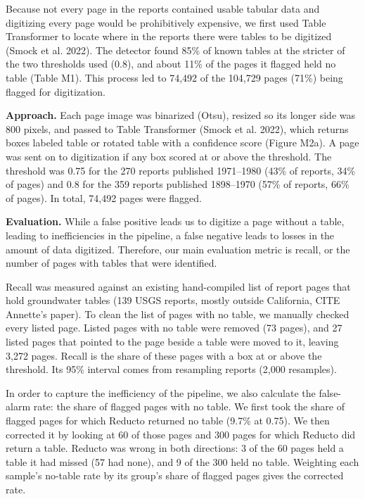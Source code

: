 Because not every page in the reports contained usable tabular data and digitizing every page would be prohibitively expensive, we first used Table Transformer to locate where in the reports there were tables to be digitized (Smock et al. 2022). The detector found 85\% of known tables at the stricter of the two thresholds used (0.8), and about 11\% of the pages it flagged held no table (Table M1). This process led to 74,492 of the 104,729 pages (71\%) being flagged for digitization.

\textbf{Approach.} Each page image was binarized (Otsu), resized so its longer side was 800 pixels, and passed to Table Transformer (Smock et al. 2022), which returns boxes labeled table or rotated table with a confidence score (Figure M2a). A page was sent on to digitization if any box scored at or above the threshold. The threshold was 0.75 for the 270 reports published 1971--1980 (43\% of reports, 34\% of pages) and 0.8 for the 359 reports published 1898--1970 (57\% of reports, 66\% of pages). In total, 74,492 pages were flagged.

\textbf{Evaluation.} While a false positive leads us to digitize a page without a table, leading to inefficiencies in the pipeline, a false negative leads to losses in the amount of data digitized. Therefore, our main evaluation metric is recall, or the number of pages with tables that were identified.

Recall was measured against an existing hand-compiled list of report pages that hold groundwater tables (139 USGS reports, mostly outside California, CITE Annette's paper). To clean the list of pages with no table, we manually checked every listed page. Listed pages with no table were removed (73 pages), and 27 listed pages that pointed to the page beside a table were moved to it, leaving 3,272 pages. Recall is the share of these pages with a box at or above the threshold. Its 95\% interval comes from resampling reports (2,000 resamples).

In order to capture the inefficiency of the pipeline, we also calculate the false-alarm rate: the share of flagged pages with no table. We first took the share of flagged pages for which Reducto returned no table (9.7\% at 0.75). We then corrected it by looking at 60 of those pages and 300 pages for which Reducto did return a table. Reducto was wrong in both directions: 3 of the 60 pages held a table it had missed (57 had none), and 9 of the 300 held no table. Weighting each sample's no-table rate by its group's share of flagged pages gives the corrected rate.

